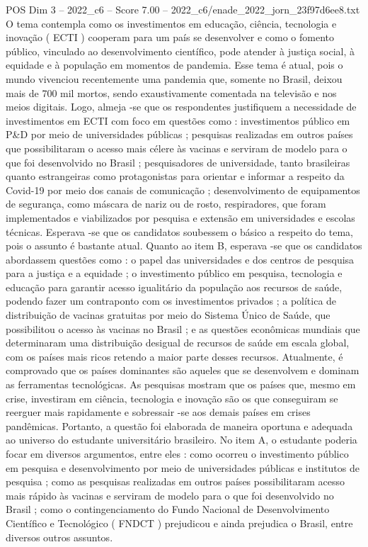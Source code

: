 \begin{textsample}{POS Dim 3 – 2022\_c6 – Score 7.00 – 2022\_c6/enade\_2022\_jorn\_23f97d6ee8.txt}
O tema contempla como os investimentos em educação, ciência, tecnologia e inovação ( ECTI ) cooperam para um país se desenvolver e como o fomento público, vinculado ao desenvolvimento científico, pode atender à justiça social, à equidade e à população em momentos de pandemia.
Esse tema é atual, pois o mundo vivenciou recentemente uma pandemia que, somente no Brasil, deixou mais de 700 mil mortos, sendo exaustivamente comentada na televisão e nos meios digitais.
Logo, almeja -se que os respondentes justifiquem a necessidade de investimentos em ECTI com foco em questões como : investimentos público em P\&D por meio de universidades públicas ; pesquisas realizadas em outros países que possibilitaram o acesso mais célere às vacinas e serviram de modelo para o que foi desenvolvido no Brasil ; pesquisadores de universidade, tanto brasileiras quanto estrangeiras como protagonistas para orientar e informar a respeito da Covid-19 por meio dos canais de comunicação ; desenvolvimento de equipamentos de segurança, como máscara de nariz ou de rosto, respiradores, que foram implementados e viabilizados por pesquisa e extensão em universidades e escolas técnicas.
Esperava -se que os candidatos soubessem o básico a respeito do tema, pois o assunto é bastante atual.
Quanto ao item B, esperava -se que os candidatos abordassem questões como : o papel das universidades e dos centros de pesquisa para a justiça e a equidade ; o investimento público em pesquisa, tecnologia e educação para garantir acesso igualitário da população aos recursos de saúde, podendo fazer um contraponto com os investimentos privados ; a política de distribuição de vacinas gratuitas por meio do Sistema Único de Saúde, que possibilitou o acesso às vacinas no Brasil ; e as questões econômicas mundiais que determinaram uma distribuição desigual de recursos de saúde em escala global, com os países mais ricos retendo a maior parte desses recursos.
Atualmente, é comprovado que os países dominantes são aqueles que se desenvolvem e dominam as ferramentas tecnológicas.
As pesquisas mostram que os países que, mesmo em crise, investiram em ciência, tecnologia e inovação são os que conseguiram se reerguer mais rapidamente e sobressair -se aos demais países em crises pandêmicas.
Portanto, a questão foi elaborada de maneira oportuna e adequada ao universo do estudante universitário brasileiro.
No item A, o estudante poderia focar em diversos argumentos, entre eles : como ocorreu o investimento público em pesquisa e desenvolvimento por meio de universidades públicas e institutos de pesquisa ; como as pesquisas realizadas em outros países possibilitaram acesso mais rápido às vacinas e serviram de modelo para o que foi desenvolvido no Brasil ; como o contingenciamento do Fundo Nacional de Desenvolvimento Científico e Tecnológico ( FNDCT ) prejudicou e ainda prejudica o Brasil, entre diversos outros assuntos.

\end{textsample}
